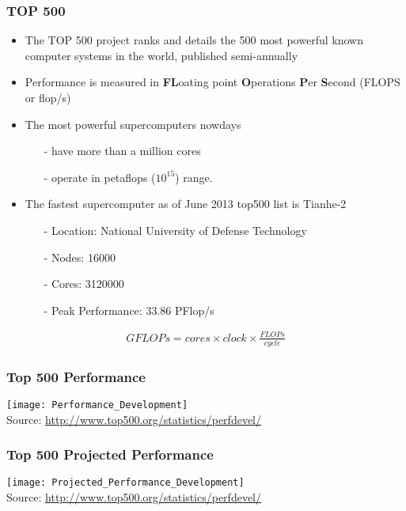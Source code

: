 \documentclass[slidestop,mathserif,compress,xcolor=svgnames,table]{beamer}
\begin{document}
\begin{frame}
  \frametitle{\small TOP 500}
  \begin{itemize}
    \item The TOP 500 project ranks and details the 500 most powerful known computer systems in the world, published semi-annually
    \item Performance is measured in \textbf{FL}oating point \textbf{O}perations \textbf{P}er \textbf{S}econd (FLOPS or flop/s)
    \item The most powerful supercomputers nowdays
    \begin{itemize}
      \item[-] have more than a million cores
      \item[-] operate in petaflops ($10^{15}$) range.
    \end{itemize}
    \item The fastest supercomputer as of June 2013 top500 list is Tianhe-2
    \begin{itemize}
      \item[-] Location: National University of Defense Technology
      \item[-] Nodes: 16000
      \item[-] Cores: 3120000
      \item[-] Peak Performance: 33.86 PFlop/s
    \end{itemize}
  \end{itemize}
  \begin{gather*}
    GFLOPs = cores \times clock \times \frac{FLOPs}{cycle}
  \end{gather*}
\end{frame}

\begin{frame}
  \frametitle{\small Top 500 Performance}
  \begin{center}
    \texttt{[image: Performance\_Development]}\\
    {\tiny Source: \url{http://www.top500.org/statistics/perfdevel/}}
  \end{center}
\end{frame}

\begin{frame}
  \frametitle{\small Top 500 Projected Performance}
  \begin{center}
    \texttt{[image: Projected\_Performance\_Development]}\\
    {\tiny Source: \url{http://www.top500.org/statistics/perfdevel/}}
  \end{center}
\end{frame}
\end{document}
